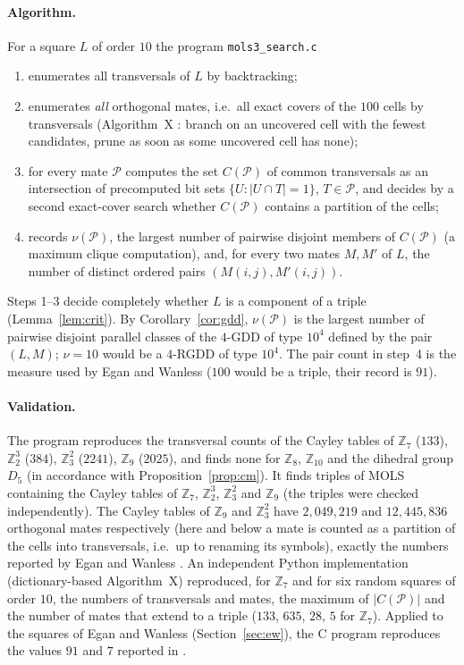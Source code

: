 \documentclass[11pt]{article}
\theoremstyle{remark}
\newcommand{\Z}{\mathbb{Z}}
\begin{document}
\paragraph{Algorithm.}  For a square $L$ of order $10$ the program
\texttt{mols3\_search.c}
\begin{enumerate}
\item enumerates all transversals of $L$ by backtracking;
\item enumerates \emph{all} orthogonal mates, i.e.\ all exact covers of the $100$ cells
  by transversals (Algorithm~X \cite{Knu00}: branch on an uncovered cell with the fewest
  candidates, prune as soon as some uncovered cell has none);
\item for every mate $\mathcal P$ computes the set $C(\mathcal P)$ of common transversals
  as an intersection of precomputed bit sets $\{U:|U\cap T|=1\}$, $T\in\mathcal P$, and
  decides by a second exact-cover search whether $C(\mathcal P)$ contains a partition of the
  cells;
\item records $\nu(\mathcal P)$, the largest number of pairwise disjoint members of
  $C(\mathcal P)$ (a maximum clique computation), and, for every two mates $M,M'$ of $L$,
  the number of distinct ordered pairs $(M(i,j),M'(i,j))$.
\end{enumerate}
Steps 1--3 decide completely whether $L$ is a component of a triple
(Lemma~\ref{lem:crit}).  By Corollary~\ref{cor:gdd}, $\nu(\mathcal P)$ is the largest number
of pairwise disjoint parallel classes of the $4$-GDD of type $10^{4}$ defined by the pair
$(L,M)$; $\nu=10$ would be a $4$-RGDD of type $10^{4}$.  The pair count in step~4 is the
measure used by Egan and Wanless ($100$ would be a triple, their record is $91$).

\paragraph{Validation.}  The program reproduces the transversal counts of the Cayley
tables of $\Z_7$ ($133$), $\Z_2^{3}$ ($384$), $\Z_3^{2}$ ($2241$), $\Z_9$ ($2025$), and
finds none for $\Z_8$, $\Z_{10}$ and the dihedral group $D_5$ (in accordance with
Proposition~\ref{prop:cm}).  It finds triples of MOLS containing the Cayley tables of
$\Z_7$, $\Z_2^{3}$, $\Z_3^{2}$ and $\Z_9$ (the triples were checked independently).  The
Cayley tables of $\Z_9$ and $\Z_3^{2}$ have $2{,}049{,}219$ and $12{,}445{,}836$ orthogonal
mates respectively (here and below a mate is counted as a partition of the cells into
transversals, i.e.\ up to renaming its symbols), exactly the numbers reported by Egan and
Wanless \cite[Section~5]{EW16}.  An independent Python implementation (dictionary-based
Algorithm~X) reproduced, for $\Z_7$ and for six random squares of order $10$, the
numbers of transversals and mates, the maximum of $|C(\mathcal P)|$ and the number of
mates that extend to a triple ($133$, $635$, $28$, $5$ for $\Z_7$).  Applied to the
squares of Egan and Wanless (Section~\ref{sec:ew}), the C program reproduces the values
$91$ and $7$ reported in \cite{EW16}.
\end{document}
